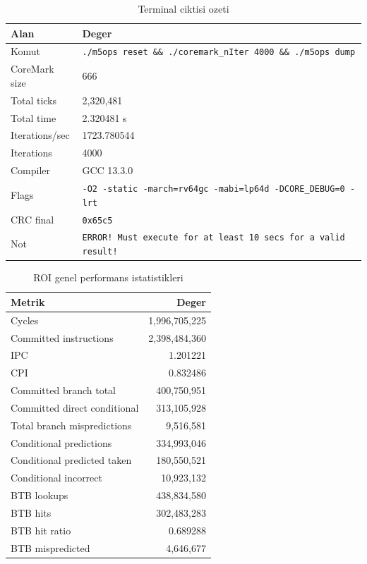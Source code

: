 \documentclass[11pt,a4paper]{article}
\newcommand{\code}[1]{\texttt{#1}}
\begin{document}
\begin{table}[!htbp]
\centering
\caption{Terminal ciktisi ozeti}
\label{tab:terminal-results}
\small
\begin{tabularx}{\linewidth}{lY}
\toprule
Alan & Deger \\
\midrule
Komut & \code{./m5ops reset \&\& ./coremark\_nIter 4000 \&\& ./m5ops dump} \\
CoreMark size & 666 \\
Total ticks & 2,320,481 \\
Total time & 2.320481 s \\
Iterations/sec & 1723.780544 \\
Iterations & 4000 \\
Compiler & GCC 13.3.0 \\
Flags & \code{-O2 -static -march=rv64gc -mabi=lp64d -DCORE\_DEBUG=0 -lrt} \\
CRC final & \code{0x65c5} \\
Not & \code{ERROR! Must execute for at least 10 secs for a valid result!} \\
\bottomrule
\end{tabularx}
\end{table}

\begin{table}[!htbp]
\centering
\caption{ROI genel performans istatistikleri}
\label{tab:perf-results}
\small
\begin{tabular}{lr}
\toprule
Metrik & Deger \\
\midrule
Cycles & 1,996,705,225 \\
Committed instructions & 2,398,484,360 \\
IPC & 1.201221 \\
CPI & 0.832486 \\
Committed branch total & 400,750,951 \\
Committed direct conditional & 313,105,928 \\
Total branch mispredictions & 9,516,581 \\
Conditional predictions & 334,993,046 \\
Conditional predicted taken & 180,550,521 \\
Conditional incorrect & 10,923,132 \\
BTB lookups & 438,834,580 \\
BTB hits & 302,483,283 \\
BTB hit ratio & 0.689288 \\
BTB mispredicted & 4,646,677 \\
\bottomrule
\end{tabular}
\end{table}
\end{document}
